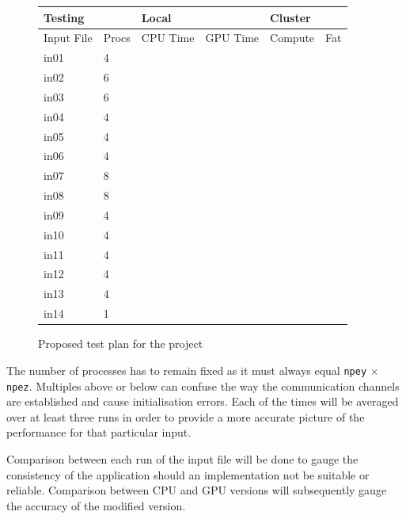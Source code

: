 \documentclass[conference]{IEEEtran}
\begin{document}
\begin{figure}[!h]
    \centering
    \begin{tabular}{|p{0.75cm}|p{0.75cm}|p{0.75cm}|p{0.75cm}|r|r|}
        \hline
        \multicolumn{2}{|l|}{Testing} & \multicolumn{2}{|l|}{Local} &\multicolumn{2}{|l|}{Cluster} \\
        \hline
        Input File & Procs & CPU Time & GPU Time & Compute & Fat \\
        \hline
        in01 & 4 &  &  &  &  \\
        \hline
        in02 & 6 &  &  &  &  \\
        \hline
        in03 & 6 &  &  &  &  \\
        \hline
        in04 & 4 &  &  &  &  \\
        \hline
        in05 & 4 &  &  &  &  \\
        \hline
        in06 & 4 &  &  &  &  \\
        \hline
        in07 & 8 &  &  &  &  \\
        \hline
        in08 & 8 &  &  &  &  \\
        \hline
        in09 & 4 &  &  &  &  \\
        \hline
        in10 & 4 &  &  &  &  \\
        \hline
        in11 & 4 &  &  &  &  \\
        \hline
        in12 & 4 &  &  &  &  \\
        \hline
        in13 & 4 &  &  &  &  \\
        \hline
        in14 & 1 &  &  &  &  \\
        \hline
    \end{tabular}
    \caption{Proposed test plan for the project}
    \label{table:localtestplan}
\end{figure}

The number of processes has to remain fixed as it must always equal \texttt{npey} $\times$ \texttt{npez}. Multiples above or below can confuse the way the communication channels are established and cause initialisation errors. Each of the times will be averaged over at least three runs in order to provide a more accurate picture of the performance for that particular input.

Comparison between each run of the input file will be done to gauge the consistency of the application should an implementation not be suitable or reliable. Comparison between CPU and GPU versions will subsequently gauge the accuracy of the modified version.
\end{document}
